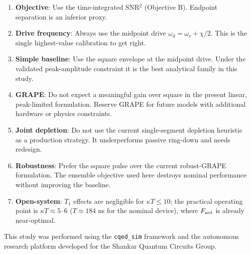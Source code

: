 \documentclass[twocolumn,prl,aps,floatfix]{revtex4-2}
\begin{document}
\begin{enumerate}
  \item \textbf{Objective}: Use the time-integrated SNR$^2$ (Objective B).  Endpoint
    separation is an inferior proxy.
  \item \textbf{Drive frequency}: Always use the midpoint drive $\omega_d = \omega_r + \chi/2$.
    This is the single highest-value calibration to get right.
  \item \textbf{Simple baseline}: Use the square envelope at the midpoint drive.  Under the
    validated peak-amplitude constraint it is the best analytical family in this study.
  \item \textbf{GRAPE}: Do not expect a meaningful gain over square in the present linear,
    peak-limited formulation.  Reserve GRAPE for future models with additional hardware or
    physics constraints.
  \item \textbf{Joint depletion}: Do not use the current single-segment depletion heuristic as a
    production strategy.  It underperforms passive ring-down and needs redesign.
  \item \textbf{Robustness}: Prefer the square pulse over the current robust-GRAPE formulation.
    The ensemble objective used here destroys nominal performance without improving the baseline.
  \item \textbf{Open-system}: $T_1$ effects are negligible for $\kappa T \leq 10$; the practical
    operating point is $\kappa T \approx 5$--$6$ ($T \approx 184$ ns for the nominal device),
    where $F_{\rm net}$ is already near-optimal.
\end{enumerate}

\begin{acknowledgments}
This study was performed using the \texttt{cqed\_sim} framework and the autonomous research
platform developed for the Shankar Quantum Circuits Group.
\end{acknowledgments}


\end{document}
